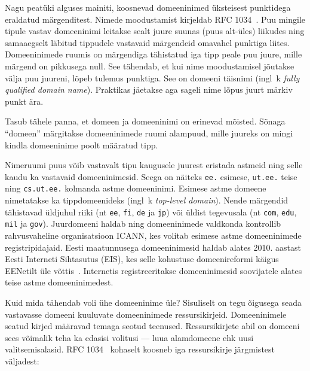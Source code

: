 \documentclass[../main.tex]{subfiles}
\begin{document}
Nagu peatüki alguses mainiti, koosnevad domeeninimed üksteisest punktidega eraldatud märgenditest.
Nimede moodustamist kirjeldab RFC 1034~\cite{rfc1034}.
Puu mingile tipule vastav domeeninimi leitakse sealt juure suunas (puus alt-üles) liikudes ning samaaegselt läbitud tippudele vastavaid märgendeid omavahel punktiga liites.
Domeeninimede ruumis on märgendiga tähistatud iga tipp peale puu juure, mille märgend on pikkusega null.
See tähendab, et kui nime moodustamisel jõutakse välja puu juureni, lõpeb tulemus punktiga.
See on domeeni täisnimi (ingl~k \textit{fully qualified domain name}).
Praktikas jäetakse aga sageli nime lõpus juurt märkiv punkt ära.

Tasub tähele panna, et domeen ja domeeninimi on erinevad mõisted.
Sõnaga \enquote{domeen} märgitakse domeeninimede ruumi alampuud, mille juureks on mingi kindla domeeninime poolt määratud tipp.

Nimeruumi puus võib vastavalt tipu kaugusele juurest eristada astmeid ning selle kaudu ka vastavaid domeeninimesid.
Seega on näiteks \texttt{ee.} esimese, \texttt{ut.ee.} teise ning \texttt{cs.ut.ee.} kolmanda astme domeeninimi.
Esimese astme domeene nimetatakse ka tippdomeenideks (ingl~k \textit{top-level domain}).
Nende märgendid tähistavad üldjuhul riiki (nt \texttt{ee}, \texttt{fi}, \texttt{de} ja \texttt{jp}) või üldist tegevusala (nt \texttt{com}, \texttt{edu}, \texttt{mil} ja \texttt{gov}).
Juurdomeeni haldab ning domeeninimede valdkonda kontrollib rahvusvaheline organisatsioon ICANN, kes volitab esimese astme domeeninimede registripidajaid.
Eesti maatunnusega domeeninimesid haldab alates 2010. aastast Eesti Interneti Sihtasutus (EIS), kes selle kohustuse domeenireformi käigus EENetilt üle võttis~\cite{eis}.
Internetis registreeritakse domeeninimesid soovijatele alates teise astme domeeninimedest.

Kuid mida tähendab voli ühe domeeninime üle?
Sisuliselt on tegu õigusega seada vastavasse domeeni kuuluvate domeeninimede ressursikirjeid.
Domeeninimele seatud kirjed määravad temaga seotud teenused.
Ressursikirjete abil on domeeni sees võimalik teha ka edasisi volitusi --- luua alamdomeene ehk uusi valitsemisalasid.
RFC 1034~\cite{rfc1034} kohaselt koosneb iga ressursikirje järgmistest väljadest:
\end{document}

